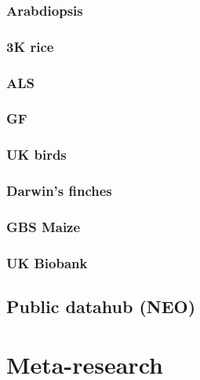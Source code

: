 \documentclass[]{book}
\begin{document}
\hypertarget{arabdiopsis}{%
\subsection{Arabdiopsis}\label{arabdiopsis}}

\hypertarget{k-rice}{%
\subsection{3K rice}\label{k-rice}}

\hypertarget{als}{%
\subsection{ALS}\label{als}}

\hypertarget{gf}{%
\subsection{GF}\label{gf}}

\hypertarget{uk-birds}{%
\subsection{UK birds}\label{uk-birds}}

\hypertarget{darwins-finches}{%
\subsection{Darwin's finches}\label{darwins-finches}}

\hypertarget{gbs-maize}{%
\subsection{GBS Maize}\label{gbs-maize}}

\hypertarget{uk-biobank}{%
\subsection{UK Biobank}\label{uk-biobank}}

\hypertarget{public-datahub-neo}{%
\section{Public datahub (NEO)}\label{public-datahub-neo}}

\hypertarget{meta-research}{%
\chapter{Meta-research}\label{meta-research}}
\end{document}
